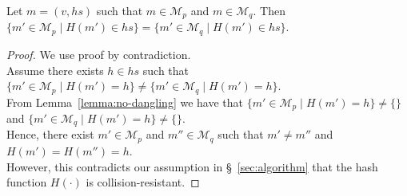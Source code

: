 \documentclass[a4paper,anonymous,USenglish]{lipics-v2019}
\begin{document}
\begin{lemma}\label{lemma:no-collision}
Let $m = (v, \mathit{hs})$ such that $m \in \mathcal{M}_p$ and $m \in \mathcal{M}_q$.
Then $\{m' \in \mathcal{M}_p \mid H(m') \in \mathit{hs}\} = \{m' \in \mathcal{M}_q \mid H(m') \in \mathit{hs}\}$.
\end{lemma}
\begin{proof}
We use proof by contradiction.\\
Assume there exists $h \in \mathit{hs}$ such that $\{m' \in \mathcal{M}_p \mid H(m') = h\} \neq \{m' \in \mathcal{M}_q \mid H(m') = h\}$.\\
From Lemma~\ref{lemma:no-dangling} we have that $\{m' \in \mathcal{M}_p \mid H(m') = h\} \neq \{\}$ and $\{m' \in \mathcal{M}_q \mid H(m') = h\} \neq \{\}$.\\
Hence, there exist $m' \in \mathcal{M}_p$ and $m'' \in \mathcal{M}_q$ such that $m' \neq m''$ and $H(m') = H(m'') = h$.\\
However, this contradicts our assumption in \S~\ref{sec:algorithm} that the hash function $H(\cdot)$ is collision-resistant.
\end{proof}
\end{document}
